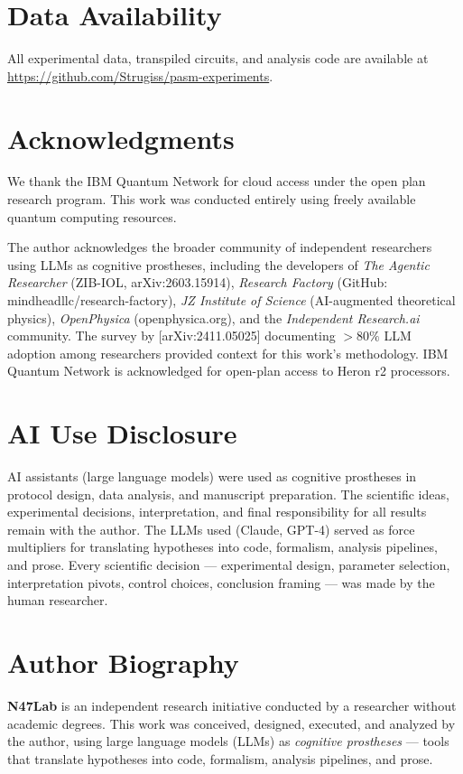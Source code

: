﻿\documentclass[12pt,a4paper]{article}
\begin{document}
\section*{Data Availability}

All experimental data, transpiled circuits, and analysis code are available at \url{https://github.com/Strugiss/pasm-experiments}.

\section*{Acknowledgments}

We thank the IBM Quantum Network for cloud access under the open plan research program. This work was conducted entirely using freely available quantum computing resources.

The author acknowledges the broader community of independent researchers using LLMs as cognitive prostheses, including the developers of \textit{The Agentic Researcher} (ZIB-IOL, arXiv:2603.15914), \textit{Research Factory} (GitHub: mindheadllc/research-factory), \textit{JZ Institute of Science} (AI-augmented theoretical physics), \textit{OpenPhysica} (openphysica.org), and the \textit{Independent Research.ai} community. The survey by [arXiv:2411.05025] documenting $>80\%$ LLM adoption among researchers provided context for this work's methodology. IBM Quantum Network is acknowledged for open-plan access to Heron r2 processors.

\section*{AI Use Disclosure}

AI assistants (large language models) were used as cognitive prostheses in protocol design, data analysis, and manuscript preparation. The scientific ideas, experimental decisions, interpretation, and final responsibility for all results remain with the author. The LLMs used (Claude, GPT-4) served as force multipliers for translating hypotheses into code, formalism, analysis pipelines, and prose. Every scientific decision — experimental design, parameter selection, interpretation pivots, control choices, conclusion framing — was made by the human researcher.

\section*{Author Biography}

\textbf{N47Lab} is an independent research initiative conducted by a researcher without academic degrees. This work was conceived, designed, executed, and analyzed by the author, using large language models (LLMs) as \textit{cognitive prostheses} — tools that translate hypotheses into code, formalism, analysis pipelines, and prose.
\end{document}
